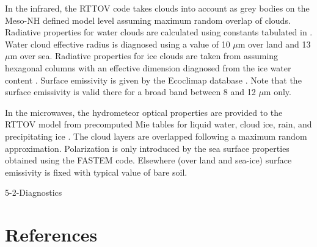 In the infrared, the RTTOV code takes clouds into account as grey bodies
\citep{Chevallier2001} on the Meso-NH defined model level assuming
maximum random overlap of clouds. Radiative properties for water clouds
are calculated using constants tabulated in \citet{Hu1993}.
Water cloud effective radius is diagnosed using a value of 10 $\mu$m
over land and 13 $\mu$m over sea.
Radiative properties for ice clouds are taken from \citet{Baran2004}
assuming hexagonal columns with an effective dimension diagnosed
from the ice water content \citep{McFarquhar2003}.
Surface emissivity is given by the Ecoclimap database \citep{Masson2003}.
Note that the surface emissivity is valid there for a broad band
between 8 and 12 $\mu$m only.

In the microwaves, the hydrometeor optical properties are provided to the RTTOV
model from precomputed Mie tables for liquid water, cloud ice, rain, and
precipitating ice \citep{Bauer2001}. The cloud layers are overlapped following
a maximum random approximation. Polarization is only introduced by the sea
surface properties obtained using the FASTEM code. Elsewhere (over land
and sea-ice) surface emissivity is fixed with typical value of bare soil.


\begin{btSect}{5-2-Diagnostics}
\section{References}
\btPrintCited
\end{btSect}
